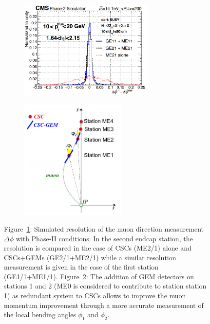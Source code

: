 	\begin{figure}[H]
		\begin{subfigure}{0.6\linewidth}
			\centering
			\includegraphics[height=5cm]{fig/chapt3/GEM-muon-direction.png}
			\caption{\label{fig:GEM-Muon:A}}
		\end{subfigure}
		\begin{subfigure}{0.4\linewidth}
			\centering
			\includegraphics[height=6cm]{fig/chapt3/GEM-Muon-bending.png}
			\caption{\label{fig:GEM-Muon:B}}
		\end{subfigure}
		\caption{\label{fig:GEM-Muon} Figure~\ref{fig:GEM-Muon:A}: Simulated resolution of the muon direction measurement $\Delta\phi$ with Phase-II conditions. In the second endcap station, the resolution is compared in the case of CSCs (ME2/1) alone and CSCs+GEMs (GE2/1+ME2/1) while a similar resolution measurement is given in the case of the first station (GE1/1+ME1/1). Figure~\ref{fig:GEM-Muon:B}: The addition of GEM detectors on stations 1 and 2 (ME0 is considered to contribute to station station 1) as redundant system to CSCs allows to improve the muon momentum improvement through a more accurate measurement of the local bending angles $\phi_1$ and $\phi_2$.}
	\end{figure}

